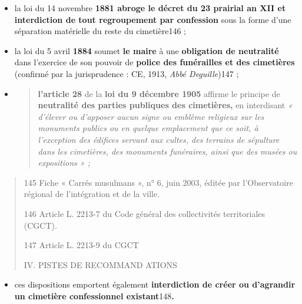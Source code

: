\begin{itemize}
\item
  la loi du 14 novembre \textbf{1881 abroge le décret du 23 prairial an
  XII et interdiction de tout regroupement par confession} sous la forme
  d'une séparation matérielle du reste du cimetière146 ;
\item
  la loi du 5 avril \textbf{1884} soumet \textbf{le maire} à une
  \textbf{obligation de neutralité} dans l'exercice de son pouvoir de
  \textbf{police des funérailles et des cimetières} (confirmé par la
  jurisprudence : CE, 1913, \emph{Abbé Deguille})147 ;
\item
  \begin{quote}
  \textbf{l'article 28} de la \textbf{loi du 9 décembre 1905} affirme le
  principe de \textbf{neutralité des parties publiques des cimetières,}
  en interdisant \emph{« d'élever ou d'apposer aucun signe ou emblème
  religieux sur les monuments publics ou en quelque emplacement que ce
  soit, à l'exception des édifices servant aux cultes, des terrains de
  sépulture dans les cimetières, des monuments funéraires, ainsi que des
  musées ou expositions » ;}
  \end{quote}
\end{itemize}

\begin{quote}
145 Fiche « Carrés musulmans », n° 6, juin 2003, éditée par
l'Observatoire régional de l'intégration et de la ville.

146 Article L. 2213-7 du Code général des collectivités territoriales
(CGCT).

147 Article L. 2213-9 du CGCT

IV. PISTES DE RECOMMAND ATIONS
\end{quote}

\begin{itemize}
\item
  ces dispositions emportent également \textbf{interdiction de créer ou
  d'agrandir un cimetière confessionnel existant}148\textbf{.}
\end{itemize}

